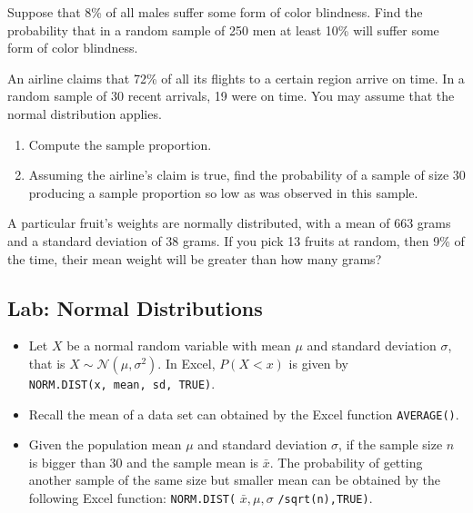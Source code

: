 \vspace*{6\baselineskip}

\begin{exercise}

Suppose that 8\% of all males suffer some form of color blindness. Find
the probability that in a random sample of 250 men at least 10\% will
suffer some form of color blindness.
  
\end{exercise}

\vspace*{6\baselineskip}

\begin{exercise}

An airline claims that 72\% of all its flights to a certain region
arrive on time. In a random sample of 30 recent arrivals, 19 were on
time. You may assume that the normal distribution applies.

\begin{enumerate}
\item
  Compute the sample proportion.
\item
  Assuming the airline's claim is true, find the probability of a sample
  of size 30 producing a sample proportion so low as was observed in
  this sample.
\end{enumerate}

\end{exercise}

\begin{exercise}

A particular fruit's weights are normally distributed, with a mean of
663 grams and a standard deviation of 38 grams.
If you pick 13 fruits at random, then 9\% of the time, their mean weight
will be greater than how many grams?

\end{exercise}

\vspace*{2.5\baselineskip}

\subsection{Lab: Normal Distributions}

\begin{itemize}
\item
  Let \(X\) be a normal random variable with mean \(\mu\) and standard
  deviation \(\sigma\), that is \(X\sim \mathcal{N}(\mu, \sigma^2)\). In
  Excel, \(P(X<x)\) is given by
  \texttt{NORM.DIST(x,\ mean,\ sd,\ TRUE)}.
\item
  Recall the mean of a data set can obtained by the Excel function
  \texttt{AVERAGE()}.
\item
  Given the population mean \(\mu\) and standard deviation \(\sigma\),
  if the sample size \(n\) is bigger than 30 and the sample mean is
  \(\bar{x}\). The probability of getting another sample of the same
  size but smaller mean can be obtained by the following Excel function:
  \texttt{NORM.DIST(} \(\bar{x},\mu,\sigma\) \texttt{/sqrt(n),TRUE)}.
\end{itemize}


